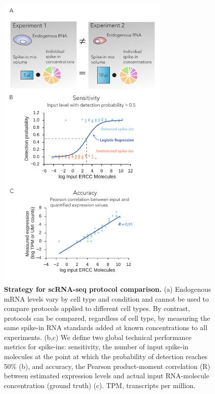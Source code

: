 \begin{figure}
    \centering
    \includegraphics[width=0.75\textwidth]{"Figure 1"}
    \caption[Strategy for scRNA-seq protocol comparison]{
    \textbf{Strategy for scRNA-seq protocol comparison.} (a) Endogenous mRNA levels vary by cell type and condition and cannot be used to compare protocols applied to different cell types. By contrast, protocols can be compared, regardless of cell type, by measuring the same spike-in RNA standards added at known concentrations to all experiments. (b,c) We define two global technical performance metrics for spike-ins: sensitivity, the number of input spike-in molecules at the point at which the probability of detection reaches 50\% (b), and accuracy, the Pearson product-moment correlation (R) between estimated expression levels and actual input RNA-molecule concentration (ground truth) (c). TPM, transcripts per million.}
    \label{fig:strategy}
\end{figure}


